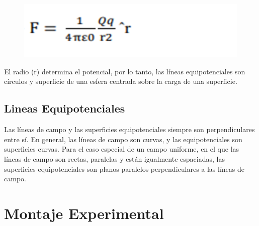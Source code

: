 \documentclass[letterpaper, 12pt]{report}
\begin{document}
\begin{figure}[H]
	\begin{center}
		\includegraphics[scale = 1]{./Images/FormulaCoulumb.png}
	\end{center}
\end{figure}

El radio (r) determina el potencial, por lo tanto, las líneas equipotenciales son 
círculos y superficie de una esfera centrada sobre la carga de una superficie.

\subsection{Lineas Equipotenciales}

Las líneas de campo y las superficies equipotenciales siempre son 
perpendiculares entre sí. En general, las líneas de campo son curvas, y 
las equipotenciales son superficies curvas. Para el caso especial de un campo 
uniforme, en el que las líneas de campo son rectas, paralelas y están 
igualmente espaciadas, las superficies equipotenciales son planos paralelos 
perpendiculares a las líneas de campo.~\cite{blas_fernandez}


\section{Montaje Experimental}
\end{document}
